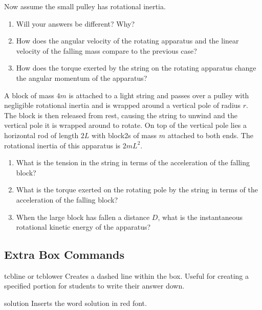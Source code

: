 	\vspace*{1\baselineskip}
\begin{disexam}
\begin{example}
Now assume the small pulley has rotational inertia.
\begin{enumerate}
\item Will your answers be different? Why?
\item How does the angular velocity of the rotating apparatus and the linear velocity of the falling mass compare to the previous case?
\item How does the torque exerted by the string on the rotating apparatus change the angular momentum of the apparatus?
\end{enumerate}
\tcbline
\vspace{1mm}
\solution
\end{example}
\end{disexam}
\begin{disexam}
\begin{longexample}
A block of mass $4m$ is attached to a light string and passes over a pulley with negligible rotational inertia and is wrapped around a vertical pole of radius $r$.  The block is then released from rest, causing the string to unwind and the vertical pole it is wrapped around to rotate.  On top of the vertical pole lies a horizontal rod of length $2L$ with block2s of mass $m$ attached to both ends.  The rotational inertia of this apparatus is $2mL^2$.
\begin{enumerate}
\item What is the tension in the string in terms of the acceleration of the falling block?
\item What is the torque exerted on the rotating pole by the string in terms of the acceleration of the falling block?
\item When the large block has fallen a distance $D$, what is the instantaneous rotational kinetic energy of the apparatus?
\end{enumerate}
\tcblower
\vspace{1mm}
\solution
\end{longexample}
\end{disexam}
\vspace{1.5mm}
	\subsection{Extra Box Commands}
		\begin{docCommand}{tcbline or tcblower}{}
				Creates a dashed line within the box. Useful for creating a specified portion for students to write their answer down.
		\end{docCommand}
		\begin{docCommand}{solution}{}
				Inserts the word solution in red font.
		\end{docCommand}
